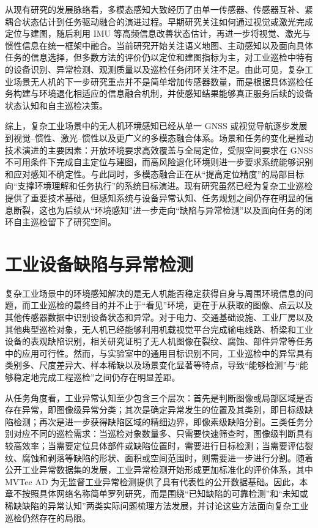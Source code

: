 从现有研究的发展脉络看，多模态感知大致经历了由单一传感器、传感器互补、紧耦合状态估计到任务驱动融合的演进过程。早期研究关注如何通过视觉或激光完成定位与建图，随后利用 IMU 等高频信息改善状态估计，再进一步将视觉、激光与惯性信息在统一框架中融合。当前研究开始关注语义地图、主动感知以及面向具体任务的信息选择，但多数方法的评价仍以定位和建图指标为主，对工业巡检中特有的设备识别、异常检测、观测质量以及巡检任务闭环关注不足。由此可见，复杂工业场景无人机的下一步研究重点并不是简单增加传感器数量，而是根据具体巡检任务构建与环境退化相适应的信息融合机制，并使感知结果能够真正服务后续的设备状态认知和自主巡检决策。

\vspace{0.5em}

综上，复杂工业场景中的无人机环境感知已经从单一 GNSS 或视觉导航逐步发展到视觉--惯性、激光--惯性以及更广义的多模态融合体系。场景和任务的变化是推动技术演进的主要因素：开放环境要求高效覆盖与全局定位，受限空间要求在 GNSS 不可用条件下完成自主定位与建图，而高风险退化环境则进一步要求系统能够识别和应对感知不确定性。与此同时，多模态融合正在从“提高定位精度”的局部目标向“支撑环境理解和任务执行”的系统目标演进。现有研究虽然已经为复杂工业巡检提供了重要技术基础，但感知系统与设备异常认知、任务规划之间仍存在明显的信息断裂，这也为后续从“环境感知”进一步走向“缺陷与异常检测”以及面向任务的闭环自主巡检留下了研究空间。


\section{工业设备缺陷与异常检测}

复杂工业场景中的环境感知解决的是无人机能否稳定获得自身与周围环境信息的问题，而工业巡检的最终目的并不止于“看见”环境，更在于从获取的图像、点云以及其他传感器数据中识别设备状态和异常。对于电力、交通基础设施、工业厂房以及其他典型巡检对象，无人机已经能够利用机载视觉平台完成输电线路、桥梁和工业设备的表观缺陷识别，相关研究证明了无人机图像在裂纹、腐蚀、部件异常等任务中的应用可行性\cite{nguyen2018automatic,miao2020uav,yeum2015vision,cha2017deep,liu2020image,tao2020detection}。然而，与实验室中的通用目标识别不同，工业巡检中的异常具有类别多、尺度差异大、样本稀缺以及场景变化显著等特点，导致“能够检测”与“能够稳定地完成工程巡检”之间仍存在明显差距。

从任务角度看，工业异常认知至少包含三个层次：首先是判断图像或局部区域是否存在异常，即图像级异常分类；其次是确定异常发生的位置及其类别，即目标级缺陷检测；再次是进一步获得缺陷区域的精细边界，即像素级缺陷分割\cite{taox2021survey}。三类任务分别对应不同的巡检需求：当巡检对象数量多、只需要快速筛查时，图像级判断具有较高效率；当需要定位具体部件或缺陷位置时，需要进行目标检测；当需要评估裂纹、腐蚀和剥落等缺陷的形状、面积或空间范围时，则需要进一步进行分割。随着公开工业异常数据集的发展，工业异常检测开始形成更加标准化的评价体系，其中 MVTec AD 为无监督工业异常检测提供了具有代表性的公开数据基础\cite{bergmann2019mvtec}。因此，本章不按照具体网络名称简单罗列研究，而是围绕“已知缺陷的可靠检测”和“未知或稀缺缺陷的异常认知”两类实际问题梳理方法发展，并讨论这些方法面向复杂工业巡检仍然存在的局限。

